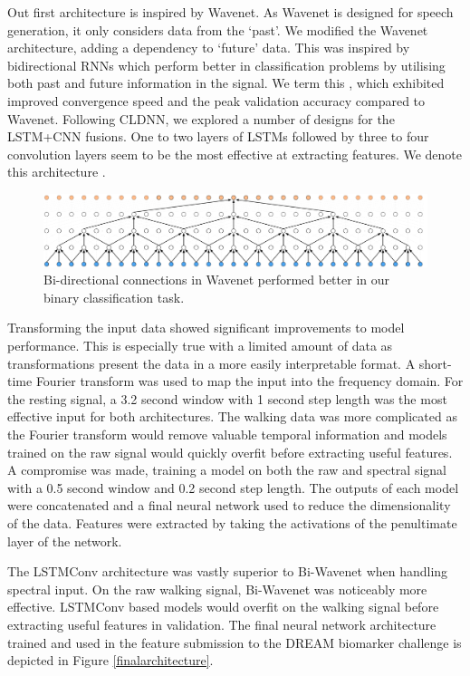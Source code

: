 \documentclass[12pt, twoside]{book}
\renewcommand\emph[1]{\textit{\color{USred}{#1}}}
\begin{document}
Out first architecture is inspired by Wavenet. As Wavenet is designed for speech generation, it only considers data from the `past'. We modified the Wavenet architecture, adding a dependency to `future' data. This was inspired by bidirectional RNNs which perform better in classification problems by utilising both past and future information in the signal. We term this \emph{Bi-Wavenet}, which exhibited improved convergence speed and the peak validation accuracy compared to Wavenet. Following CLDNN, we explored a number of designs for the LSTM+CNN fusions. One to two layers of LSTMs followed by three to four convolution layers seem to be the most effective at extracting features. We denote this architecture \emph{LSTMConv}. 


\begin{figure}[h]
	\label{biwavenet}
	\centering\centerline{\includegraphics[width=1\linewidth]{biwavenet.png}}
	\caption{Bi-directional connections in Wavenet performed better in our binary classification task. }
\end{figure}


Transforming the input data showed significant improvements to model performance. This is especially true with a limited amount of data as transformations present the data in a more easily interpretable format. A short-time Fourier transform was used to map the input into the frequency domain. For the resting signal, a 3.2 second window with 1 second step length was the most effective input for both architectures. The walking data was more complicated as the Fourier transform would remove valuable temporal information and models trained on the raw signal would quickly overfit before extracting useful features. A compromise was made, training a model on both the raw and spectral signal with a 0.5 second window and 0.2 second step length. The outputs of each model were concatenated and a final neural network used to reduce the dimensionality of the data. Features were extracted by taking the activations of the penultimate layer of the network.


The LSTMConv architecture was vastly superior to Bi-Wavenet when handling spectral input. On the raw walking signal, Bi-Wavenet was noticeably more effective. LSTMConv based models would overfit on the walking signal before extracting useful features in validation. The final neural network architecture trained and used in the feature submission to the DREAM biomarker challenge is depicted in Figure \ref{finalarchitecture}.
\end{document}
